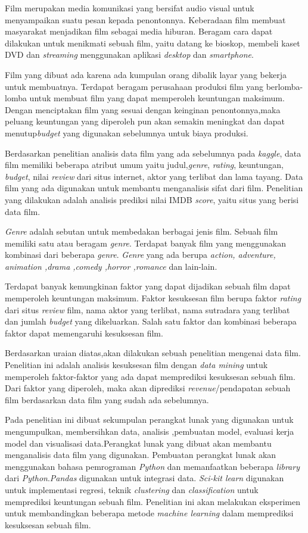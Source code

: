 \documentclass[a4paper,twoside]{article}
\begin{document}
Film merupakan media komunikasi yang bersifat audio visual untuk menyampaikan suatu pesan kepada penontonnya. Keberadaan film membuat masyarakat menjadikan film sebagai media hiburan. Beragam cara dapat dilakukan untuk menikmati sebuah film, yaitu datang ke bioskop, membeli kaset DVD dan \textit{streaming} menggunakan aplikasi \textit{desktop} dan \textit{smartphone}.

Film yang dibuat ada karena ada kumpulan orang dibalik layar yang bekerja untuk membuatnya. Terdapat beragam perusahaan produksi film yang berlomba-lomba untuk membuat film yang dapat memperoleh keuntungan maksimum. Dengan menciptakan film yang sesuai dengan keinginan penontonnya,maka peluang keuntungan yang diperoleh pun akan semakin meningkat dan dapat menutup\textit{budget} yang digunakan sebelumnya untuk biaya produksi.
	
Berdasarkan penelitian analisis data film yang ada sebelumnya pada \textit{kaggle}, data film memiliki beberapa atribut umum yaitu judul,\textit{genre}, \textit{rating}, keuntungan,\textit{ budget}, nilai \textit{review} dari situs internet, aktor yang terlibat dan lama tayang. Data film yang ada digunakan untuk membantu menganalisis sifat dari film. Penelitian yang dilakukan adalah analisis prediksi nilai IMDB \textit{score}, yaitu situs yang berisi data film. 	
	

\textit{Genre} adalah sebutan untuk membedakan berbagai jenis film. Sebuah film memiliki satu atau beragam \textit{genre}. Terdapat banyak film yang menggunakan kombinasi dari beberapa \textit{genre}.  \textit{Genre} yang ada berupa \textit{action, adventure, animation ,drama ,comedy ,horror ,romance} dan lain-lain. 

Terdapat banyak kemungkinan faktor yang dapat dijadikan sebuah film dapat memperoleh keuntungan maksimum. Faktor kesuksesan film berupa faktor \textit{rating} dari situs \textit{review} film, nama aktor yang terlibat, nama sutradara yang terlibat dan jumlah \textit{budget} yang dikeluarkan. Salah satu faktor dan kombinasi beberapa faktor dapat memengaruhi kesuksesan film.
	
Berdasarkan uraian diatas,akan dilakukan sebuah penelitian mengenai data film. Penelitian ini adalah analisis kesuksesan film dengan \textit{data mining} untuk memperoleh faktor-faktor yang ada dapat memprediksi  kesuksesan sebuah film. Dari faktor yang diperoleh, maka akan diprediksi \textit{revenue}/pendapatan sebuah film berdasarkan data film yang sudah ada sebelumnya. 
	
Pada penelitian ini dibuat sekumpulan perangkat lunak yang digunakan untuk mengumpulkan, membersihkan data, analisis ,pembuatan model, evaluasi kerja model dan visualisasi data.Perangkat lunak yang dibuat akan membantu menganalisis data film yang digunakan. Pembuatan perangkat lunak akan menggunakan bahasa pemrograman \textit{Python} dan memanfaatkan beberapa \textit{library} dari \textit{Python}.\textit{Pandas} digunakan untuk integrasi data. \textit{Sci-kit learn} digunakan untuk implementasi regresi, teknik \textit{clustering} dan \textit{classification} untuk memprediksi keuntungan sebuah film. Penelitian ini akan melakukan eksperimen untuk membandingkan beberapa metode \textit{machine learning} dalam memprediksi kesuksesan sebuah film.
\end{document}
